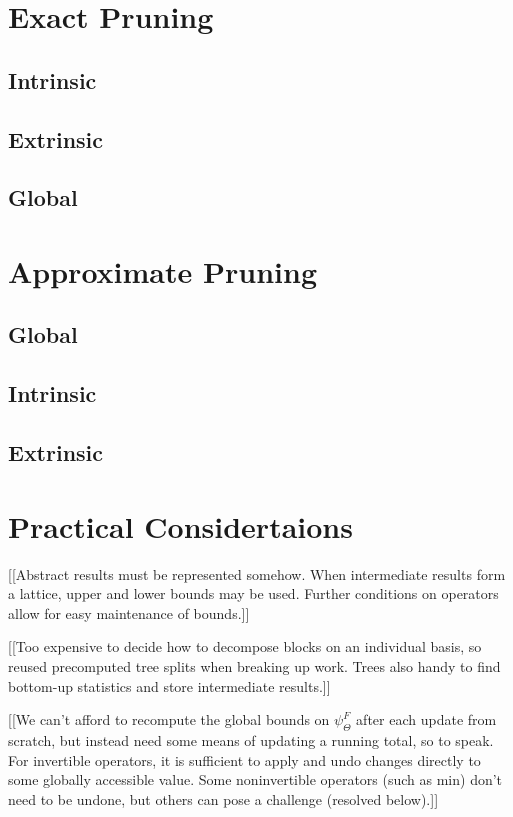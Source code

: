 \documentclass{article}
\newcommand{\GNP}{\psi_{\Theta}}
\begin{document}
\section{Exact Pruning}

\subsection{Intrinsic}

\subsection{Extrinsic}

\subsection{Global}

\section{Approximate Pruning}

\subsection{Global}

\subsection{Intrinsic}

\subsection{Extrinsic}

\section{Practical Considertaions}

[[Abstract results must be represented somehow.  When intermediate
results form a lattice, upper and lower bounds may be used.  Further
conditions on operators allow for easy maintenance of bounds.]]

[[Too expensive to decide how to decompose blocks on an individual
basis, so reused precomputed tree splits when breaking up work.  Trees
also handy to find bottom-up statistics and store intermediate
results.]]

[[We can't afford to recompute the global bounds on $\GNP^F$ after
each update from scratch, but instead need some means of updating a
running total, so to speak.  For invertible operators, it is
sufficient to apply and undo changes directly to some globally
accessible value.  Some noninvertible operators (such as min) don't
need to be undone, but others can pose a challenge (resolved below).]]
\end{document}
